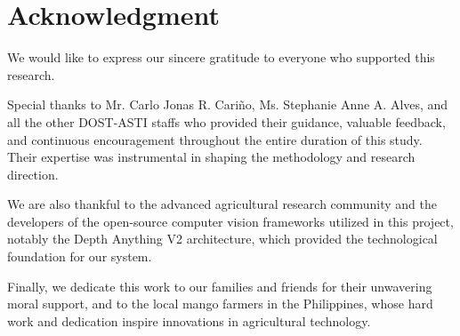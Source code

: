 \section*{Acknowledgment}

We would like to express our sincere gratitude to everyone who supported this
research. 

Special thanks to Mr. Carlo Jonas R. Cari\~{n}o, Ms. Stephanie Anne A. 
Alves, and all the other DOST-ASTI staffs who provided their guidance, valuable 
feedback, and continuous encouragement throughout the entire duration of this 
study. Their expertise was instrumental in shaping the methodology and research 
direction.

We are also thankful to the advanced agricultural research community and the
developers of the open-source computer vision frameworks utilized in this project,
notably the Depth Anything V2 architecture, which provided the technological 
foundation for our system.

Finally, we dedicate this work to our families and friends for their unwavering moral
support, and to the local mango farmers in the Philippines, whose hard work and
dedication inspire innovations in agricultural technology. 
